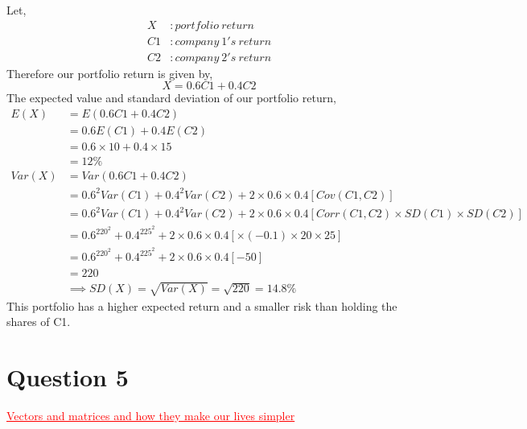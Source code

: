 \documentclass[12pt]{report}
\begin{document}
\noindent Let,
\begin{align*}
X&: portfolio\ return \\
C1&: company\ 1's\ return \\
C2&: company\ 2's\ return
\end{align*}
\noindent Therefore our portfolio return is given by,
$$X=0.6C1 + 0.4C2$$
\noindent The expected value and standard deviation of our portfolio return,
\begin{align*}
E(X)&=E(0.6C1 + 0.4C2) \\
&= 0.6E(C1) + 0.4E(C2) \\
&= 0.6\times 10 + 0.4\times 15 \\
&= 12\% \\
Var(X)&=Var(0.6C1 + 0.4C2) \\
&= 0.6^2Var(C1) + 0.4^2Var(C2) + 2\times 0.6\times 0.4[Cov(C1,C2)] \\
&= 0.6^2Var(C1) + 0.4^2Var(C2) + 2\times 0.6\times 0.4[Corr(C1,C2)\times SD(C1) \times SD(C2)] \\
&= 0.6^220^2 + 0.4^225^2 + 2\times 0.6\times 0.4[\times (-0.1)\times 20 \times 25] \\
&= 0.6^220^2 + 0.4^225^2 + 2\times 0.6\times 0.4[-50] \\
&= 220 \\
&\implies SD(X) = \sqrt{Var(X)} = \sqrt{220} = 14.8\%
\end{align*}
\noindent This portfolio has a higher expected return and a smaller risk than holding the shares of C1.

\newpage
\section*{Question 5}
\textcolor{red}{\underline{Vectors and matrices and how they make our lives simpler}}
\end{document}
